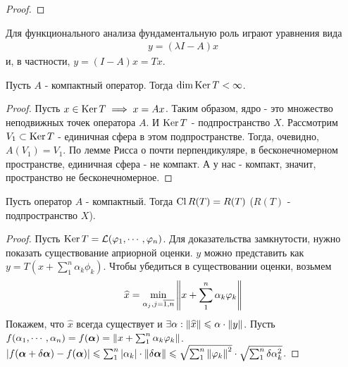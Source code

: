 \begin{proof}
    \todo
\end{proof}

Для функционального анализа фундаментальную роль играют уравнения вида 
\begin{gather}
    y = (\lambda I - A)x
\end{gather}
и, в частности, $y = (I - A)x = Tx$. 


\begin{statement}
    Пусть $A$ - компактный оператор. Тогда $\dim \operatorname{Ker} T < \infty$.
\end{statement}

\begin{proof}
    Пусть $x \in \operatorname{Ker} T \implies x = Ax$. Таким образом, ядро - это множество неподвижных точек оператора $A$. И $\operatorname{Ker} T$ - подпространство $X$.
    Рассмотрим $V_1 \subset \operatorname{Ker} T$ - единичная сфера в этом подпространстве. Тогда, очевидно, $A(V_1) = V_1$. По лемме Рисса о почти перпендикуляре, в бесконечномерном 
    пространстве, единичная сфера - не компакт. А у нас - компакт, значит,  пространство не бесконечномерное.
\end{proof}


\begin{theorem}
    Пусть оператор $A$ - компактный. Тогда $\operatorname{Cl} R(T) = R(T)$ ($R(T)$ - подпространство $X$).
\end{theorem}

\begin{proof}
    Пусть $\operatorname{Ker} T =\mathcal{L}(\varphi_1, \cdots, \varphi_n)$. Для доказательства замкнутости, нужно показать существование априорной оценки. 
    $y$ можно представить как $y = T\left( x +\sum_{1}^{n}\alpha_k \phi_k \right)$. Чтобы убедиться в существовании оценки, возьмем 
    \begin{gather}
    \widehat{x} = \min_{\alpha_j, j=\overline{1,n}}\left\|x + \sum_{1}^{n}\alpha_k \varphi_k\right\|
    \end{gather}
    Покажем, что $\widehat{x}$ всегда существует и $\exists \alpha: \left\|\widehat{x}\right\|\leqslant\alpha\cdot\left\|y\right\|$.
    Пусть $f(\alpha_1, \cdots, \alpha_n) = f(\boldsymbol{\alpha}) = \left\|x + \sum_{1}^{n}\alpha_k \varphi_k\right\|$.
    $\left|f(\boldsymbol{\alpha} + \delta\boldsymbol{\alpha}) - f(\boldsymbol{\alpha})\right| \leqslant \sum_{1}^{n}\left|\alpha_k\right| \cdot\left\|\delta\boldsymbol{\alpha}\right\|
    \leqslant \sqrt{\sum_{1}^{n}\left\|\varphi_k\right\|^2}\cdot\sqrt{\sum_{1}^{n}\delta\alpha_k^2}$.
\end{proof}
